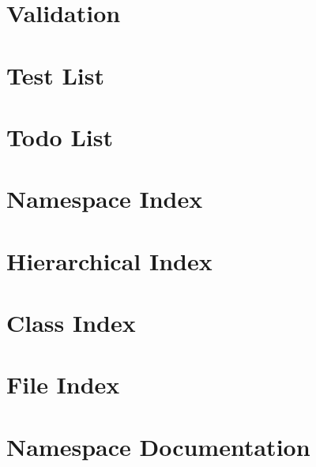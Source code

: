 \documentclass{book}
\begin{document}
\chapter{Validation}
\label{Validation}
\hypertarget{Validation}{}

\chapter{Test List}
\label{test}
\hypertarget{test}{}

\chapter{Todo List}
\label{todo}
\hypertarget{todo}{}

\chapter{Namespace Index}

\chapter{Hierarchical Index}

\chapter{Class Index}

\chapter{File Index}

\chapter{Namespace Documentation}


\end{document}
